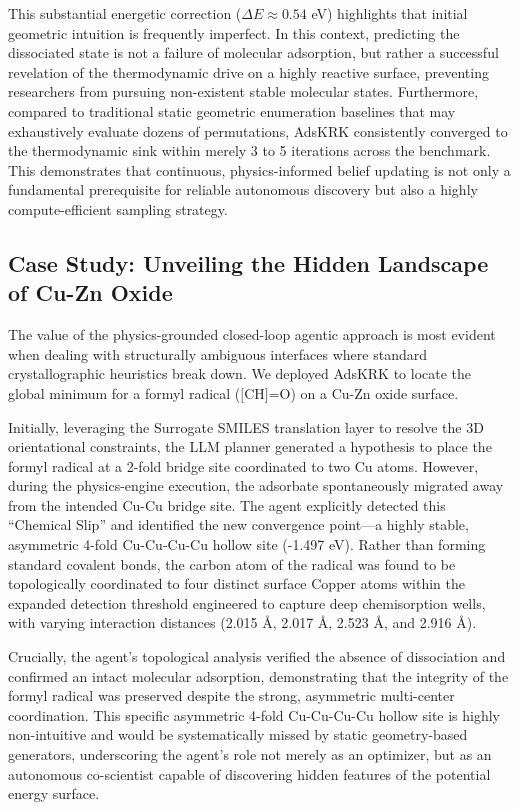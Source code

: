 \documentclass{article}
\begin{document}
This substantial energetic correction ($\Delta E \approx 0.54$ eV) highlights that initial geometric intuition is frequently imperfect. In this context, predicting the dissociated state is not a failure of molecular adsorption, but rather a successful revelation of the thermodynamic drive on a highly reactive surface, preventing researchers from pursuing non-existent stable molecular states. Furthermore, compared to traditional static geometric enumeration baselines that may exhaustively evaluate dozens of permutations, AdsKRK consistently converged to the thermodynamic sink within merely 3 to 5 iterations across the benchmark. This demonstrates that continuous, physics-informed belief updating is not only a fundamental prerequisite for reliable autonomous discovery but also a highly compute-efficient sampling strategy.

\subsection{Case Study: Unveiling the Hidden Landscape of Cu-Zn Oxide}
The value of the physics-grounded closed-loop agentic approach is most evident when dealing with structurally ambiguous interfaces where standard crystallographic heuristics break down. We deployed AdsKRK to locate the global minimum for a formyl radical ($\text{[CH]=O}$) on a Cu-Zn oxide surface.

Initially, leveraging the Surrogate SMILES translation layer to resolve the 3D orientational constraints, the LLM planner generated a hypothesis to place the formyl radical at a 2-fold bridge site coordinated to two Cu atoms. However, during the physics-engine execution, the adsorbate spontaneously migrated away from the intended Cu-Cu bridge site. The agent explicitly detected this ``Chemical Slip'' and identified the new convergence point---a highly stable, asymmetric 4-fold Cu-Cu-Cu-Cu hollow site (-1.497 eV). Rather than forming standard covalent bonds, the carbon atom of the radical was found to be topologically coordinated to four distinct surface Copper atoms within the expanded detection threshold engineered to capture deep chemisorption wells, with varying interaction distances (2.015 \AA{}, 2.017 \AA{}, 2.523 \AA{}, and 2.916 \AA{}).

Crucially, the agent's topological analysis verified the absence of dissociation and confirmed an intact molecular adsorption, demonstrating that the integrity of the formyl radical was preserved despite the strong, asymmetric multi-center coordination. This specific asymmetric 4-fold Cu-Cu-Cu-Cu hollow site is highly non-intuitive and would be systematically missed by static geometry-based generators, underscoring the agent's role not merely as an optimizer, but as an autonomous co-scientist capable of discovering hidden features of the potential energy surface.
\end{document}
